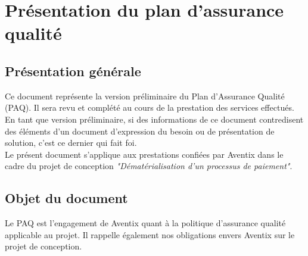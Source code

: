 

\usepackage{array}

\newcommand{\CUBref}[6]{
  \renewcommand{\arraystretch}{1.75}
  \setlength{\tabcolsep}{0.5cm}
  \begin{tabular}{r l}
    \multicolumn{2}{l}{\large{\textbf{#1}}} \\
    \textbf{Description} & #2 \\
    \textbf{Acteur} & #3 \\
    \textbf{Précondition} & #4 \\
    \textbf{Conséquence} & #5 \\
    \textbf{Exception} & \multicolumn{1}{p{\textwidth}}{#6} \\
  \end{tabular}
}




\section{Présentation du plan d'assurance qualité}
\subsection{Présentation générale}
Ce document représente la version préliminaire du Plan d'Assurance Qualité
(PAQ). Il sera revu et complété au cours de la prestation des services
effectués. \\

En tant que version préliminaire, si des informations de ce document
contredisent des éléments d'un document d'expression du besoin ou de
présentation de solution, c'est ce dernier qui fait foi. \\

Le présent document s'applique aux prestations confiées par Aventix dans le
cadre du projet de conception \textit{"Dématérialisation d'un processus de
paiement"}. \\

\subsection{Objet du document}
Le PAQ est l'engagement de Aventix quant à la politique d'assurance qualité
applicable au projet.
Il rappelle également nos obligations envers Aventix sur le projet de conception.
\\

